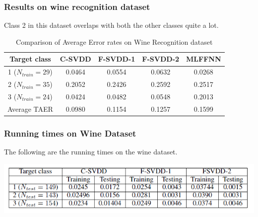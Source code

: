 \documentclass{beamer}
\begin{document}
\begin{frame}

\frametitle{Results on wine recognition dataset}
Class 2 in this dataset overlaps with both the other classes quite a lot.
\begin{table}[H]
\begin{center}
\caption{Comparison of Average Error rates on Wine Recognition dataset}
\begin{tabular}{|c|c|c|c|c|}
\hline
Target class & C-SVDD & F-SVDD-1 & F-SVDD-2 & MLFFNN \\ \hline
1 ($N_{train} = 29$) & 0.0464   & 0.0554  & 0.0632   & 0.0268\\ \hline
2 ($N_{train} = 35$) &  0.2052  &  0.2426   & 0.2592   & 0.2517 \\ \hline
3 ($N_{train} = 24$) & 0.0424   &  0.0482  &  0.0548 &  0.2013 \\ \hline
Average TAER &  0.0980 & 0.1154 & 0.1257 &  0.1599 \\ \hline

\end{tabular}
\end{center}
\end{table}



\end{frame}


\begin{frame}
\frametitle{Running times on Wine Dataset}
The following are the running times on the wine dataset.
\begin{center}
\includegraphics[scale=0.7]{wine_runtime}
\end{center}
\end{frame}


\end{document}
